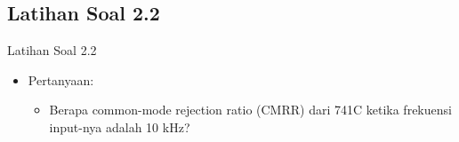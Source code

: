 \subsection{Latihan Soal 2.2}
\begin{frame}{Latihan Soal 2.2}
	\begin{itemize}
		\item Pertanyaan:
		\begin{itemize}
			\item Berapa common-mode rejection ratio (CMRR) dari 741C ketika frekuensi input-nya adalah 10 kHz?
		\end{itemize}
	\end{itemize}
\end{frame}